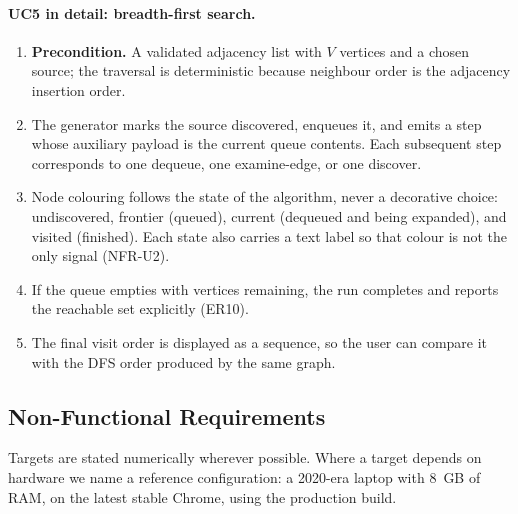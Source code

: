 \documentclass[11pt,a4paper]{article}
\begin{document}
\paragraph{UC5 in detail: breadth-first search.}
\begin{enumerate}[leftmargin=1.6em,itemsep=2pt]
  \item \textbf{Precondition.} A validated adjacency list with $V$ vertices and a chosen
        source; the traversal is deterministic because neighbour order is the adjacency
        insertion order.
  \item The generator marks the source discovered, enqueues it, and emits a step whose
        auxiliary payload is the current queue contents. Each subsequent step corresponds
        to one dequeue, one examine-edge, or one discover.
  \item Node colouring follows the state of the algorithm, never a decorative choice:
        undiscovered, frontier (queued), current (dequeued and being expanded), and visited
        (finished). Each state also carries a text label so that colour is not the only
        signal (NFR-U2).
  \item If the queue empties with vertices remaining, the run completes and reports the
        reachable set explicitly (ER10).
  \item The final visit order is displayed as a sequence, so the user can compare it with
        the DFS order produced by the same graph.
\end{enumerate}

\subsection{Non-Functional Requirements}

Targets are stated numerically wherever possible. Where a target depends on hardware we
name a reference configuration: a 2020-era laptop with 8~GB of RAM, on the latest stable
Chrome, using the production build.
\end{document}
